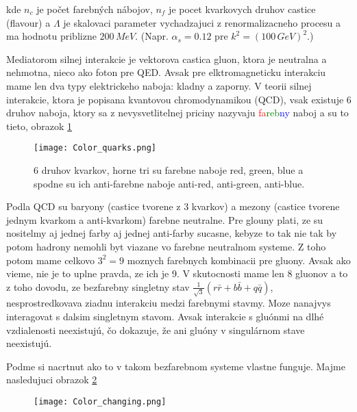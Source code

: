 \documentclass[../../main.tex]{subfiles}
\begin{document}
kde $n_c$ je počet farebných nábojov, $n_f$ je pocet kvarkovych druhov castice (flavour) a $\Lambda$ je skalovaci parameter vychadzajuci z renormalizacneho procesu a ma hodnotu priblizne $200\,MeV$. (Napr. $\alpha_s=0.12$ pre $k^2=(100\,GeV)^2$.)\par
Mediatorom silnej interakcie je vektorova castica gluon, ktora je neutralna a nehmotna, nieco ako foton pre QED. Avsak pre elktromagneticku interakciu mame len dva typy elektrickeho naboja: kladny a zaporny. V teorii silnej interakcie, ktora je popisana kvantovou chromodynamikou (QCD), vsak existuje 6 druhov naboja, ktory sa z nevysvetlitelnej priciny nazyvaju \textcolor{red}{fa}\textcolor{green}{reb}\textcolor{blue}{ny} naboj a su to tieto, obrazok \ref{sf1:fig:Color_quarks}
\begin{figure}[!h]
\centering
\texttt{[image: Color\_quarks.png]}
\caption{6 druhov kvarkov, horne tri su farebne naboje red, green, blue a spodne su ich anti-farebne naboje anti-red, anti-green, anti-blue.}
\label{sf1:fig:Color_quarks}
\end{figure}
\newline
Podla QCD su baryony (castice tvorene z 3 kvarkov) a mezony (castice tvorene jednym kvarkom a anti-kvarkom) farebne neutralne. Pre glouny plati, ze su nositelmy aj jednej farby aj jednej anti-farby sucasne, kebyze to tak nie tak by potom hadrony nemohli byt viazane vo farebne neutralnom systeme.  Z toho potom mame celkovo $3^2=9$ moznych farebnych kombinacii pre gluony. Avsak ako vieme, nie je to uplne pravda, ze ich je 9. V skutocnosti mame len 8 gluonov a to z toho dovodu, ze bezfarebny singletny stav $\frac{1}{\sqrt{3}}(r\bar{r}+b\bar{b}+q\bar{q})$, nesprostredkovava ziadnu interakciu medzi farebnymi stavmy. Moze nanajvys interagovat s dalsim singletnym stavom. Avsak interakcie s gluónmi na dlhé vzdialenosti neexistujú, čo dokazuje, že ani gluóny v singulárnom stave neexistujú.\par
Podme si nacrtnut ako to v takom bezfarebnom systeme vlastne funguje. Majme nasledujuci obrazok \ref{sf1:fig:Prechody}
\begin{figure}[!h]
\centering
\texttt{[image: Color\_changing.png]}
\caption{}
\label{sf1:fig:Prechody}
\end{figure}
\newline
\end{document}
